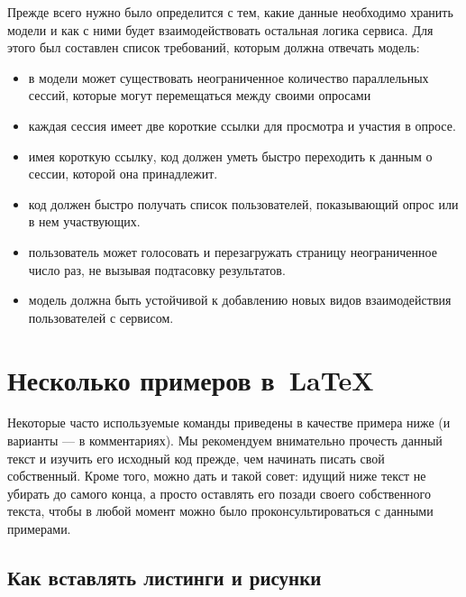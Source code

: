 Прежде всего нужно было определится с тем, какие данные необходимо хранить модели и как с ними будет взаимодействовать остальная логика сервиса. Для этого был составлен список требований, которым должна отвечать модель:
 
\begin{itemize}
 \item в модели может существовать неограниченное количество параллельных сессий, которые могут перемещаться между своими опросами 
 \item каждая сессия имеет две короткие ссылки для просмотра и участия в опросе. 
 \item имея короткую ссылку, код должен уметь быстро переходить к данным о сессии, которой она принадлежит.
 \item код должен быстро получать список пользователей, показывающий опрос или в нем участвующих.
 \item пользователь может голосовать и перезагружать страницу неограниченное число раз, не вызывая подтасовку результатов.
 \item модель должна быть устойчивой к добавлению новых видов взаимодействия пользователей с сервисом.
\end{itemize}
 
 
 
 
 
 
   
\section{Несколько примеров в~\LaTeX{}}
\label{sec:examples}

Некоторые часто используемые
команды приведены в качестве примера ниже (и варианты — в
комментариях). Мы рекомендуем внимательно прочесть данный
текст и изучить его исходный код прежде, чем начинать писать
свой собственный. Кроме того, можно дать и такой совет: идущий
ниже текст не убирать до самого конца, а просто оставлять его
позади своего собственного текста, чтобы в любой момент можно
было проконсультироваться с данными примерами.

\subsection{Как вставлять листинги и рисунки}

